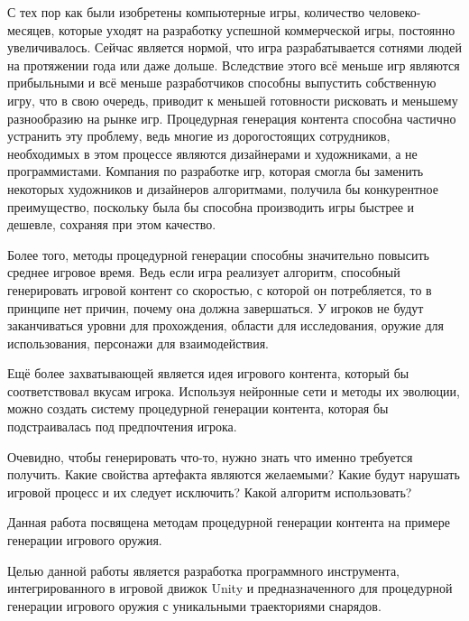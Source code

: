 ﻿%

С тех пор как были изобретены компьютерные игры, количество человеко-месяцев, которые уходят на разработку успешной коммерческой игры, постоянно увеличивалось. Сейчас является нормой, что игра разрабатывается сотнями людей на протяжении года или даже дольше. Вследствие этого всё меньше игр являются прибыльными и всё меньше разработчиков способны выпустить собственную игру, что в свою очередь, приводит к меньшей готовности рисковать и меньшему разнообразию на рынке игр. Процедурная генерация контента способна частично устранить эту проблему, ведь многие из дорогостоящих сотрудников, необходимых в этом процессе являются дизайнерами и художниками, а не программистами. Компания по разработке игр, которая смогла бы заменить некоторых художников и дизайнеров алгоритмами, получила бы конкурентное преимущество, поскольку была бы способна производить игры быстрее и дешевле, сохраняя при этом качество.

Более того, методы процедурной генерации способны значительно повысить среднее игровое время. Ведь если игра реализует алгоритм, способный генерировать игровой контент со скоростью, с которой он потребляется, то в принципе нет причин, почему она должна завершаться. У игроков не будут заканчиваться уровни для прохождения, области для исследования, оружие для использования, персонажи для взаимодействия.

Ещё более захватывающей является идея игрового контента, который бы соответствовал вкусам игрока. Используя нейронные сети и методы их эволюции, можно создать систему процедурной генерации контента, которая бы подстраивалась под предпочтения игрока. 

Очевидно, чтобы генерировать что-то, нужно знать что именно требуется получить. Какие свойства артефакта являются желаемыми? Какие будут нарушать игровой процесс и их следует исключить? Какой алгоритм использовать?

Данная работа посвящена методам процедурной генерации контента на примере генерации игрового оружия. 

\pagebreak


Целью данной работы является разработка программного инструмента, интегрированного в игровой движок Unity и предназначенного для процедурной генерации игрового оружия с уникальными траекториями снарядов.

